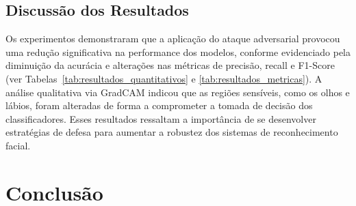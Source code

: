 \documentclass[12pt]{article}
\begin{document}
\subsection{Discussão dos Resultados}
Os experimentos demonstraram que a aplicação do ataque adversarial provocou uma redução significativa na performance dos modelos, conforme evidenciado pela diminuição da acurácia e alterações nas métricas de precisão, recall e F1-Score (ver Tabelas~\ref{tab:resultados_quantitativos} e \ref{tab:resultados_metricas}). A análise qualitativa via GradCAM indicou que as regiões sensíveis, como os olhos e lábios, foram alteradas de forma a comprometer a tomada de decisão dos classificadores. Esses resultados ressaltam a importância de se desenvolver estratégias de defesa para aumentar a robustez dos sistemas de reconhecimento facial.




\section{Conclusão}



\nocite{*}
\end{document}
